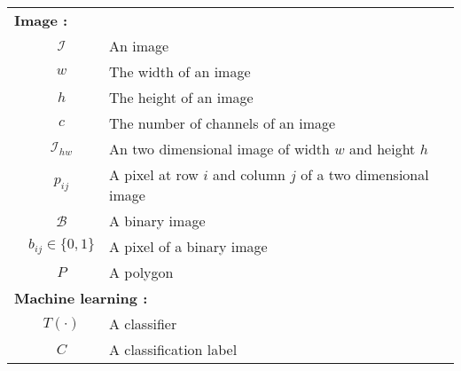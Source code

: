 \begin{tabular}{lcl}
	\multicolumn{3}{l}{\textbf{Image :}} \\ 
	& $\mathcal{I}$ & An image \\
	& $w$ & The width of an image \\
	& $h$ & The height of an image \\
	& $c$ & The number of channels of an image \\
	& $\mathcal{I}_{hw}$ & An two dimensional image of width $w$ and height $h$ \\	
	& $p_{ij}$ & A pixel at row $i$ and column $j$ of a two dimensional image \\
	& $\mathcal{B}$ & A binary image \\
	& $b_{ij} \in \{0, 1\}$ & A pixel of a binary image\\
	& $P$ & A polygon \\
	\multicolumn{3}{l}{\textbf{Machine learning :}} \\ 
	& $T(\cdot)$ & A classifier \\
	& $C$ & A classification label \\
\end{tabular}